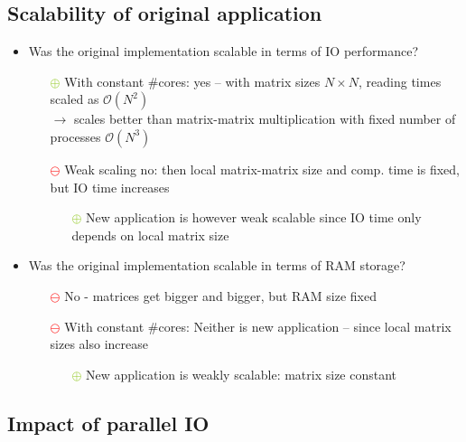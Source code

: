 \documentclass[9pt,pdftex,xcolor=dvipsnames]{beamer}
\begin{document}
\subsection{Scalability of original application}
\begin{frame}{\insertsubsection}
\begin{itemize}
\item Was the original implementation scalable in terms of IO performance?
\begin{itemize}
	\item[\textcolor{YellowGreen}{$\bm\oplus$}] With constant \#cores: yes -- with matrix sizes $N \times N$, reading times scaled as $\mathcal{O}\left(N^2\right)$\\
	$\rightarrow$ scales better than matrix-matrix multiplication with fixed number of processes $\mathcal{O}\left(N^3\right)$
    \item[\textcolor{red}{$\bm\ominus$}] Weak scaling no: then local matrix-matrix size and comp. time is fixed, but IO time increases
    \begin{itemize}
    \item[\textcolor{YellowGreen}{$\bm\oplus$}] New application is however weak scalable since IO time only depends on local matrix size
\end{itemize}
\end{itemize}
\item Was the original implementation scalable in terms of RAM storage?
\begin{itemize}
    \item[\textcolor{red}{$\bm\ominus$}] No - matrices get bigger and bigger, but RAM size fixed
    \item[\textcolor{red}{$\bm\ominus$}] With constant \#cores: Neither is new application -- since local matrix sizes also increase
    \begin{itemize}
    \item[\textcolor{YellowGreen}{$\bm\oplus$}] New application is weakly scalable: matrix size constant            
    \end{itemize}
\end{itemize}
\end{itemize}
\end{frame}


\subsection{Impact of parallel IO}
\end{document}
